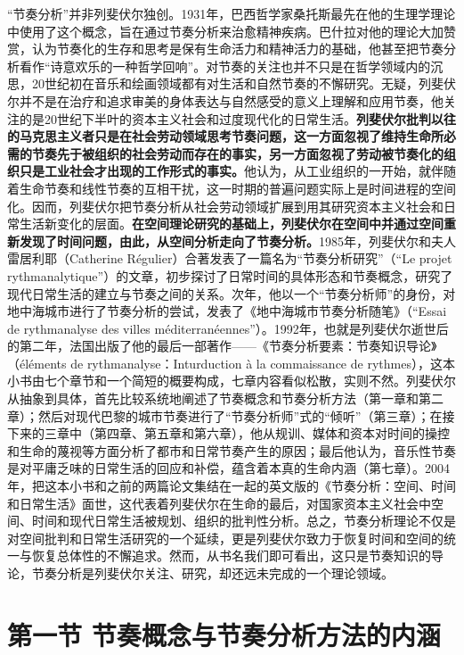 \documentclass[UTF8, fontset = sourcesans, a4paper, oneside, zihao =
-4, scheme=chinese, no-math, space=true]{ctexbook}
\begin{document}
``节奏分析''并非列斐伏尔独创。1931年，巴西哲学家桑托斯最先在他的生理学理论中使用了这个概念，旨在通过节奏分析来治愈精神疾病。巴什拉对他的理论大加赞赏，认为节奏化的生存和思考是保有生命活力和精神活力的基础，他甚至把节奏分析看作``诗意欢乐的一种哲学回响''。对节奏的关注也并不只是在哲学领域内的沉思，20世纪初在音乐和绘画领域都有对生活和自然节奏的不懈研究。无疑，列斐伏尔并不是在治疗和追求审美的身体表达与自然感受的意义上理解和应用节奏，他关注的是20世纪下半叶的资本主义社会和过度现代化的日常生活。\textbf{列斐伏尔批判以往的马克思主义者只是在社会劳动领域思考节奏问题，这一方面忽视了维持生命所必需的节奏先于被组织的社会劳动而存在的事实，另一方面忽视了劳动被节奏化的组织只是工业社会才出现的工作形式的事实。}他认为，从工业组织的一开始，就伴随着生命节奏和线性节奏的互相干扰，这一时期的普遍问题实际上是时间进程的空间化。因而，列斐伏尔把节奏分析从社会劳动领域扩展到用其研究资本主义社会和日常生活新变化的层面。\textbf{在空间理论研究的基础上，列斐伏尔在空间中并通过空间重新发现了时间问题，由此，从空间分析走向了节奏分析。}1985年，列斐伏尔和夫人雷居利耶（Catherine
Régulier）合著发表了一篇名为``节奏分析研究''（``Le projet
rythmanalytique''）的文章，初步探讨了日常时间的具体形态和节奏概念，研究了现代日常生活的建立与节奏之间的关系。次年，他以一个``节奏分析师''的身份，对地中海城市进行了节奏分析的尝试，发表了《地中海城市节奏分析随笔》（``Essai
de rythmanalyse des villes
méditerranéennes''）。1992年，也就是列斐伏尔逝世后的第二年，法国出版了他的最后一部著作------《节奏分析要素：节奏知识导论》（éléments
de rythmanalyse：Inturduction à la commaissance de
rythmes），这本小书由七个章节和一个简短的概要构成，七章内容看似松散，实则不然。列斐伏尔从抽象到具体，首先比较系统地阐述了节奏概念和节奏分析方法（第一章和第二章）；然后对现代巴黎的城市节奏进行了``节奏分析师''式的``倾听''（第三章）；在接下来的三章中（第四章、第五章和第六章），他从规训、媒体和资本对时间的操控和生命的蔑视等方面分析了都市和日常节奏产生的原因；最后他认为，音乐性节奏是对平庸乏味的日常生活的回应和补偿，蕴含着本真的生命内涵（第七章）。2004年，把这本小书和之前的两篇论文集结在一起的英文版的《节奏分析：空间、时间和日常生活》面世，这代表着列斐伏尔在生命的最后，对国家资本主义社会中空间、时间和现代日常生活被规划、组织的批判性分析。总之，节奏分析理论不仅是对空间批判和日常生活研究的一个延续，更是列斐伏尔致力于恢复时间和空间的统一与恢复总体性的不懈追求。然而，从书名我们即可看出，这只是节奏知识的导论，节奏分析是列斐伏尔关注、研究，却还远未完成的一个理论领域。

\protect\hypertarget{part0009_split_001.html}{}{}

\hypertarget{part0009_split_001.htmlux5cux23b014}{\section{第一节
节奏概念与节奏分析方法的内涵}\label{part0009_split_001.htmlux5cux23b014}}
\end{document}
